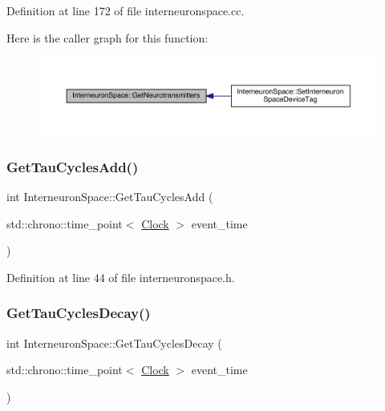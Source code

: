 Definition at line 172 of file interneuronspace.\+cc.

Here is the caller graph for this function\+:\nopagebreak
\begin{figure}[H]
\begin{center}
\leavevmode
\includegraphics[width=350pt]{class_interneuron_space_aaae45b76a4c059aae1e27bde3901371c_icgraph}
\end{center}
\end{figure}
\mbox{\label{class_interneuron_space_abd37d409a97acca62d11576314bdfcf4}} 
\subsubsection{\texorpdfstring{Get\+Tau\+Cycles\+Add()}{GetTauCyclesAdd()}}
{\footnotesize\ttfamily int Interneuron\+Space\+::\+Get\+Tau\+Cycles\+Add (\begin{DoxyParamCaption}\item[{std\+::chrono\+::time\+\_\+point$<$ \hyperlink{universe_8h_a0ef8d951d1ca5ab3cfaf7ab4c7a6fd80}{Clock} $>$}]{event\+\_\+time }\end{DoxyParamCaption})\hspace{0.3cm}{\ttfamily [inline]}}



Definition at line 44 of file interneuronspace.\+h.

\mbox{\label{class_interneuron_space_a1024eadca0b56be9b54593ea47c5879f}} 
\subsubsection{\texorpdfstring{Get\+Tau\+Cycles\+Decay()}{GetTauCyclesDecay()}}
{\footnotesize\ttfamily int Interneuron\+Space\+::\+Get\+Tau\+Cycles\+Decay (\begin{DoxyParamCaption}\item[{std\+::chrono\+::time\+\_\+point$<$ \hyperlink{universe_8h_a0ef8d951d1ca5ab3cfaf7ab4c7a6fd80}{Clock} $>$}]{event\+\_\+time }\end{DoxyParamCaption})\hspace{0.3cm}{\ttfamily [inline]}}



